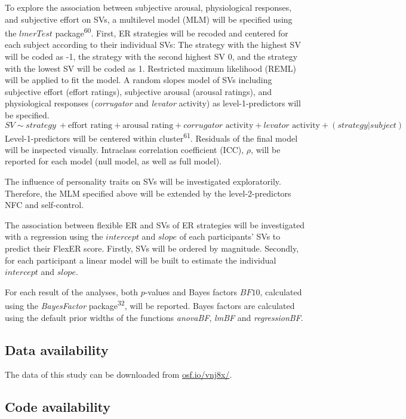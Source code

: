 \documentclass[
  english,
  man,floatsintext]{apa6}
\begin{document}
To explore the association between subjective arousal, physiological responses, and subjective effort on SVs, a multilevel model (MLM) will be specified using the \(lmerTest\) package\textsuperscript{60}.
First, ER strategies will be recoded and centered for each subject according to their individual SVs: The strategy with the highest SV will be coded as -1, the strategy with the second highest SV 0, and the strategy with the lowest SV will be coded as 1.
Restricted maximum likelihood (REML) will be applied to fit the model.
A random slopes model of SVs including subjective effort (effort ratings), subjective arousal (arousal ratings), and physiological responses (\emph{corrugator} and \emph{levator} activity) as level-1-predictors will be specified.
\[
SV \sim strategy\ + \text{effort rating} + \text{arousal rating} + corrugator \text{ activity} + levator \text{ activity} + (strategy|subject)
\]
Level-1-predictors will be centered within cluster\textsuperscript{61}.
Residuals of the final model will be inspected visually.
Intraclass correlation coefficient (ICC), \(\rho\), will be reported for each model (null model, as well as full model).

The influence of personality traits on SVs will be investigated exploratorily.
Therefore, the MLM specified above will be extended by the level-2-predictors NFC and self-control.

The association between flexible ER and SVs of ER strategies will be investigated with a regression using the \(intercept\) and \(slope\) of each participants' SVs to predict their FlexER score.
Firstly, SVs will be ordered by magnitude.
Secondly, for each participant a linear model will be built to estimate the individual \(intercept\) and \(slope\).

For each result of the analyses, both \(p\)-values and Bayes factors \(BF10\), calculated using the \emph{BayesFactor} package\textsuperscript{32}, will be reported.
Bayes factors are calculated using the default prior widths of the functions \emph{anovaBF}, \emph{lmBF} and \emph{regressionBF}.

\hypertarget{data-availability}{%
\subsection{Data availability}\label{data-availability}}

The data of this study can be downloaded from \href{https://osf.io/vnj8x/}{osf.io/vnj8x/}.

\hypertarget{code-availability}{%
\subsection{Code availability}\label{code-availability}}
\end{document}

